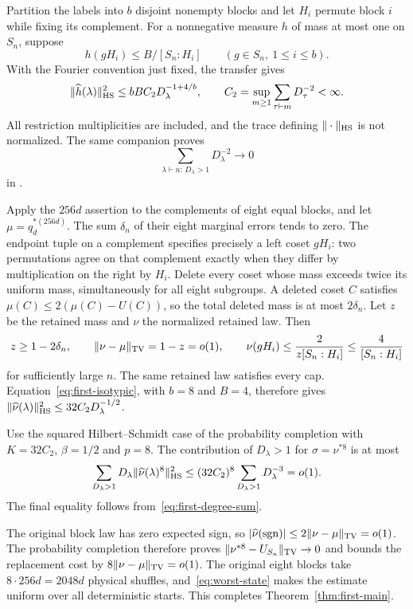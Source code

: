 Partition the labels into $b$ disjoint nonempty blocks and let $H_i$
permute block $i$ while fixing its complement. For a nonnegative
measure $h$ of mass at most one on $S_n$, suppose
\[
 h(gH_i)\le B/[S_n:H_i]\qquad(g\in S_n,\ 1\le i\le b).
\]
With the Fourier convention just fixed, the transfer gives
\begin{equation}\label{eq:first-isotypic}
 \|\widehat h(\lambda)\|_{\mathrm{HS}}^2
 \le bBC_2D_\lambda^{-1+4/b},\qquad
 C_2=\sup_{m\ge1}\sum_{\tau\vdash m}D_\tau^{-2}<\infty.
\end{equation}
All restriction multiplicities are included, and the trace defining
$\|\cdot\|_{\mathrm{HS}}$ is not normalized. The same companion proves
\begin{equation}\label{eq:first-degree-sum}
 \sum_{\lambda\vdash n:\,D_\lambda>1}D_\lambda^{-2}\longrightarrow0
\end{equation}
in \cite[Lemma~\ref*{l-l:degree-reciprocal-two}]{partialFourier}.

Apply the $256d$ assertion to the complements of eight equal blocks,
and let $\mu=q_d^{*(256d)}$. The sum $\delta_n$ of their eight
marginal errors tends to zero. The endpoint tuple on a complement
specifies precisely a left coset $gH_i$: two permutations agree on
that complement exactly when they differ by multiplication on the
right by $H_i$. Delete every coset whose mass exceeds twice its
uniform mass, simultaneously for all eight subgroups. A deleted coset
$C$ satisfies $\mu(C)\le2(\mu(C)-U(C))$, so the total deleted
mass is at most $2\delta_n$. Let $z$ be the retained mass and
$\nu$ the normalized retained law. Then
\[
 z\ge1-2\delta_n,\qquad
 \|\nu-\mu\|_{\mathrm{TV}}=1-z=o(1),\qquad
 \nu(gH_i)\le\frac{2}{z[S_n:H_i]}\le\frac4{[S_n:H_i]}
\]
for sufficiently large $n$. The same retained law satisfies every cap.
Equation~\eqref{eq:first-isotypic}, with $b=8$ and $B=4$, therefore
gives $\|\widehat\nu(\lambda)\|_{\mathrm{HS}}^2\le32C_2D_\lambda^{-1/2}$.

Use the squared Hilbert--Schmidt case of the probability completion
with $K=32C_2$, $\beta=1/2$ and $p=8$. The contribution of
$D_\lambda>1$ for $\sigma=\nu^{*8}$ is at most
\[
 \sum_{D_\lambda>1}D_\lambda
       \|\widehat\nu(\lambda)^8\|_{\mathrm{HS}}^2
 \le(32C_2)^8\sum_{D_\lambda>1}D_\lambda^{-3}=o(1).
\]
The final equality follows from~\eqref{eq:first-degree-sum}.

The original block law has zero expected sign, so
$|\widehat\nu(\mathrm{sgn})|\le2\|\nu-\mu\|_{\mathrm{TV}}=o(1)$.
The probability completion therefore proves
$\|\nu^{*8}-U_{S_n}\|_{\mathrm{TV}}\to0$ and bounds the replacement cost by
$8\|\nu-\mu\|_{\mathrm{TV}}=o(1)$.
The original eight blocks take $8\cdot256d=2048d$ physical shuffles,
and~\eqref{eq:worst-state} makes the estimate uniform over all
deterministic starts. This completes Theorem~\ref{thm:first-main}.
